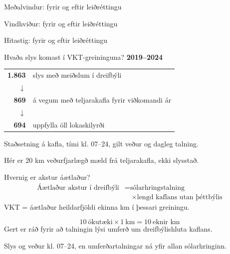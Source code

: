\documentclass[aspectratio=169,12pt,t]{beamer}
\begin{document}
\begin{frame}{Meðalvindur: fyrir og eftir leiðréttingu}
\relax
{}
\end{frame}

\begin{frame}{Vindhviður: fyrir og eftir leiðréttingu}
\relax
{}
\end{frame}

\begin{frame}{Hitastig: fyrir og eftir leiðréttingu}
\relax
{}
\end{frame}

\begin{frame}{Hvaða slys komast í VKT-greininguna?}
\relax
\textbf{2019--2024}\par
\vspace{3mm}
\begin{tabular}{@{}rl@{}}
\textbf{1.863} & slys með meiðslum í dreifbýli\\[3mm]
$\downarrow$ & \\
\textbf{869} & á vegum með teljarakafla fyrir viðkomandi ár\\[3mm]
$\downarrow$ & \\
\textbf{694} & uppfylla öll lokaskilyrði\\
\end{tabular}\par
\vspace{4mm}
Staðsetning á kafla, tími kl. 07--24, gilt veður og dagleg talning.\par
{\small Hér er 20 km veðurfjarlægð mæld frá teljarakafla, ekki slysstað.\par}
\end{frame}

\begin{frame}{Hvernig er akstur áætlaður?}
\relax
\[
\begin{aligned}
\text{Áætlaður akstur í dreifbýli} &= \text{sólarhringstalning}\\
&\quad\times\text{lengd kaflans utan þéttbýlis}
\end{aligned}
\]
\vspace{3mm}
VKT = áætlaður heildarfjöldi ekinna km í þessari greiningu.\par
\vspace{4mm}
\[
10\ \text{ökutæki}\times1\ \text{km}=10\ \text{eknir km}
\]
\vspace{4mm}
Gert er ráð fyrir að talningin lýsi umferð um dreifbýlishluta kaflans.\par
{\small Slys og veður kl. 07--24, en umferðartalningar ná yfir allan sólarhringinn.\par}
\end{frame}
\end{document}
